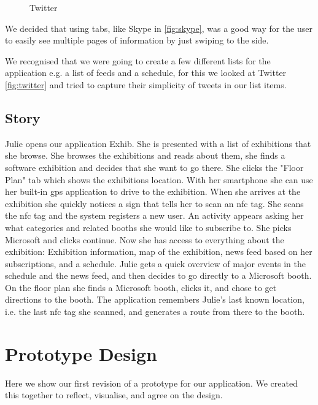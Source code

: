 \begin{figure}[H]
\begin{minipage}[b]{0.5\columnwidth}
\caption{Twitter\label{fig:twitter}}
\end{minipage}
\end{figure}

We decided that using tabs, like Skype in  \autoref{fig:skype}, was a good way for the user to easily see multiple pages of information by just swiping to the side.

We recognised that we were going to create a few different lists for the application e.g. a list of feeds and a schedule, for this we looked at Twitter \autoref{fig:twitter} and tried to capture their simplicity of tweets in our list items.

\subsection*{Story}
Julie opens our application Exhib. She is presented with a list of exhibitions that she browse. She browses the exhibitions and reads about them, she finds a software exhibition and decides that she want to go there. She clicks the "Floor Plan" tab which shows the exhibitions location. With her smartphone she can use her built-in \ac{gps} application to drive to the exhibition. When she arrives at the exhibition she quickly notices a sign that tells her to scan an \acs{nfc} tag. She scans the \acs{nfc} tag and the system registers a new user. An activity appears asking her what categories and related booths she would like to subscribe to. She picks Microsoft and clicks continue. Now she has access to everything about the exhibition: Exhibition information, map of the exhibition, news feed based on her subscriptions, and a schedule. Julie gets a quick overview of major events in the schedule and the news feed, and then decides to go directly to a Microsoft booth. On the floor plan she finds a Microsoft booth, clicks it, and chose to get directions to the booth. The application remembers Julie's last known location, i.e. the last \acs{nfc} tag she scanned, and generates a route from there to the booth.

\section{Prototype Design}

Here we show our first revision of a prototype for our application. We created this together to reflect, visualise, and agree on the design.

